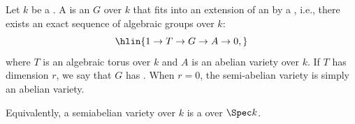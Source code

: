 \begin{definition} \label{definition:semi_abelian_variety_over_a_field}
    Let $k$ be a . A  is an  $G$ over $k$ that fits into an extension of an  by a , i.e., there exists an exact sequence of algebraic groups over $k$:
    $$\hlin{1 \to T \to G \to A \to 0,}$$
    where $T$ is an algebraic torus over $k$ and $A$ is an abelian variety over $k$. If $T$ has dimension $r$, we say that $G$ has . When $r = 0$, the semi-abelian variety is simply an abelian variety.

    Equivalently, a semiabelian variety over $k$ is a  over $\Spec k$.
\end{definition}
